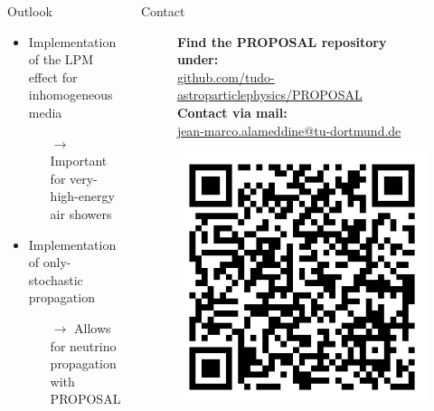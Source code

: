 \documentclass[t]{beamer}
\newlength{\itemseparation}
\begin{document}
  \begin{columns}[onlytextwidth]%
    \begin{column}{0.4\textwidth}%
      \begin{block}[equal height group=Z]{Outlook}%
        \begin{itemize}
          \setlength\itemsep{\itemseparation}
          \item Implementation of the LPM effect for inhomogeneous media
          \begin{itemize}
            \setlength\itemsep{\itemseparation}
            \item[$\rightarrow$] Important for very-high-energy air showers
          \end{itemize}
          \item Implementation of only-stochastic propagation
          \begin{itemize}
            \setlength\itemsep{\itemseparation}
            \item[$\rightarrow$] Allows for neutrino propagation with PROPOSAL
          \end{itemize}
        \end{itemize}
      \end{block}
    \end{column}
    \begin{column}{0.4\textwidth}%
      \begin{block}[equal height group=Z]{Contact}%
        \begin{center}
          \begin{figure}[ht]
            \begin{minipage}[ht]{0.75\linewidth}
              \textbf{Find the PROPOSAL repository under:}\\ \url{github.com/tudo-astroparticlephysics/PROPOSAL} \vspace{0.5em}\\
              \textbf{Contact via mail:}\\ \href{mailto:me@jean-marco.alameddine@tu-dortmund.de}{jean-marco.alameddine@tu-dortmund.de} 
            \end{minipage}
            \begin{minipage}[ht]{0.24\linewidth}
              \centering
                \includegraphics[width=0.66\linewidth, valign=t]{plots/qr_proposal.png}

\end{minipage}
\end{figure}
\end{center}
\end{block}
\end{column}
\end{columns}
\end{document}
